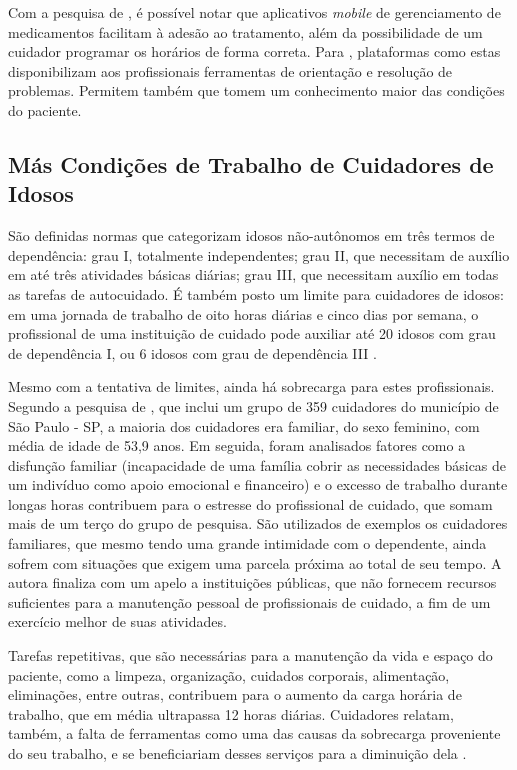 \documentclass[
	article,			%
	12pt,				%
	oneside,			%
	a4paper,			%
    BIBLATEX,           %
	english,			%
	brazil,				%
	sumario=tradicional
	]{abntex2}
\begin{document}
Com a pesquisa de , é possível notar que aplicativos \textit{mobile} de gerenciamento de medicamentos facilitam à adesão ao tratamento, além da possibilidade de um cuidador programar os horários de forma correta. Para , plataformas como estas disponibilizam aos profissionais ferramentas de orientação e resolução de problemas. Permitem também que tomem um conhecimento maior das condições do paciente.

\subsection{Más Condições de Trabalho de Cuidadores de Idosos}

São definidas normas que categorizam idosos não-autônomos em três termos de dependência: grau I, totalmente independentes; grau II, que necessitam de auxílio em até três atividades básicas diárias; grau III, que necessitam auxílio em todas as tarefas de autocuidado. É também posto um limite para cuidadores de idosos: em uma jornada de trabalho de oito horas diárias e cinco dias por semana, o profissional de uma instituição de cuidado pode auxiliar até 20 idosos com grau de dependência I, ou 6 idosos com grau de dependência III \cite{ministeriosaude2021ilpi}.

Mesmo com a tentativa de limites, ainda há sobrecarga para estes profissionais. Segundo a pesquisa de , que inclui um grupo de 359 cuidadores do município de São Paulo - SP, a maioria dos cuidadores era familiar, do sexo feminino, com média de idade de 53,9 anos. Em seguida, foram analisados fatores como a disfunção familiar (incapacidade de uma família cobrir as necessidades básicas de um indivíduo como apoio emocional e financeiro) e o excesso de trabalho durante longas horas contribuem para o estresse do profissional de cuidado, que somam mais de um terço do grupo de pesquisa. São utilizados de exemplos os cuidadores familiares, que mesmo tendo uma grande intimidade com o dependente, ainda sofrem com situações que exigem uma parcela próxima ao total de seu tempo. A autora finaliza com um apelo a instituições públicas, que não fornecem recursos suficientes para a manutenção pessoal de profissionais de cuidado, a fim de um exercício melhor de suas atividades.

Tarefas repetitivas, que são necessárias para a manutenção da vida e espaço do paciente, como a limpeza, organização, cuidados corporais, alimentação, eliminações, entre outras, contribuem para o aumento da carga horária de trabalho, que em média ultrapassa 12 horas diárias. Cuidadores relatam, também, a falta de ferramentas como uma das causas da sobrecarga proveniente do seu trabalho, e se beneficiariam desses serviços para a diminuição dela \cite{aline2012sobrecarga}.
\end{document}
